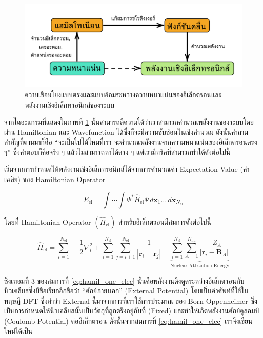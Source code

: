 \begin{figure}[htbp]
    \centering
    \includegraphics[width=\linewidth]{fig/density_wavefunc_ener.png}
    \caption{ความเชื่อมโยงแบบตรงและแบบอ้อมระหว่างความหนาแน่นของอิเล็กตรอนและพลังงานเชิงอิเล็กทรอนิกส์ของระบบ}
    \label{fig:density_wavefunc_ener}
\end{figure}

จากไดอะแกรมที่แสดงในภาพที่ \ref{fig:density_wavefunc_ener} นั้นสามารถตีความได้ว่าเราสามารถคำนวณพลังงานของระบบโดยผ่าน
Hamiltonian และ Wavefunction ได้ซึ่งก็จะมีความซับซ้อนในเชิงคำนวณ ดังนั้นคำถามสำคัญที่ตามมาก็คือ \enquote{จะเป็นไปได้ไหมที่เรา%
    จะคำนวณพลังงานจากความหนาแน่นของอิเล็กตรอนตรง ๆ} ซึ่งคำตอบก็คือจริง ๆ แล้วไม่สามารถหาได้ตรง ๆ แต่เรามีทริคที่สามารถทำได้ดังต่อไปนี้

เริ่มจากการกำหนดให้พลังงานเชิงอิเล็กทรอนิกส์ได้จากการคำนวณค่า Expectation Value (ค่าเฉลี่ย) ของ Hamiltonian Operator

\begin{equation}\label{eq:ener_expect_value}
    E_{\text{el}} = \int \cdots \int \Psi^{\ast} \hat{H}_{\text{el}} \Psi \, d\bm{x}_{1} \dots \,
    d\bm{x}_{N_{\text{el}}}
\end{equation}

\noindent โดยที่ Hamiltonian Operator $(\hat{H}_{\text{el}})$ สำหรับอิเล็กตรอนมีสมการดังต่อไปนี้

\begin{equation}\label{eq:hamil_one_elec}
    \hat{H}_{\text{el}} = \sum^{N_{\text{el}}}_{i=1} -\frac{1}{2} \nabla^{2}_{i}
    + \sum^{N_{\text{el}}}_{i=1} \sum^{N_{\text{el}}}_{j=i+1} \frac{1}{|\bm{r}_{i}-\bm{r}_{j}|}
    + \underbrace{\sum^{N_{\text{el}}}_{i=1} \sum^{N_{\text{nu}}}_{A=1} \frac{-Z_{A}}{|\bm{r}_{i}-\bm{R}_{A}|}}%
    _{\text{Nuclear Attraction Energy}}
\end{equation}

\noindent ซึ่งเทอมที่ 3 ของสมการที่ \eqref{eq:hamil_one_elec} นั้นคือพลังงานดึงดูดระหว่างอิเล็กตรอนกับนิวเคลียสซึ่งมีชื่อเรียกอีกชื่อว่า
\enquote{ศักย์ภายนอก} (External Potential) โดยเป็นคำศัพท์ที่ใช้ในทฤษฎี DFT ซึ่งคำว่า External นี้มาจากการที่เราใช้การประมาณ%
ของ Born-Oppenheimer ซึ่งเป็นการกำหนดให้นิวเคลียสนั้นเป็นวัตถุที่ถูกตรึงอยู่กับที่ (Fixed) และทำให้เกิดพลังงานศักย์คูลอมป์ (Coulomb
Potential) ต่ออิเล็กตรอน ดังนั้นจากสมการที่ \eqref{eq:hamil_one_elec} เราจึงเขียนใหม่ได้เป็น

